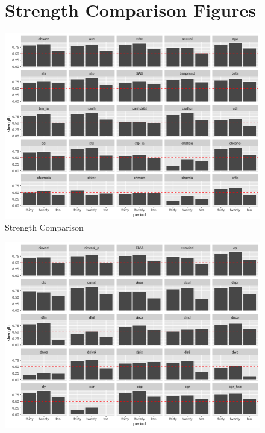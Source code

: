 \begin{landscape}
\begin{figure}[ht]
\section{Strength Comparison Figures}\label{strength_figures}
			\centering
			\caption{Strength Comparison}\label{figure:strength_compare}
				\includegraphics[scale = 0.75]{strength_comparison_I}
\end{figure}
\end{landscape}



\begin{landscape}
\begin{figure}[ht]
		\includegraphics[scale = 0.75]{strength_comparison_II}
		\centering
	\end{figure}
\end{landscape}

